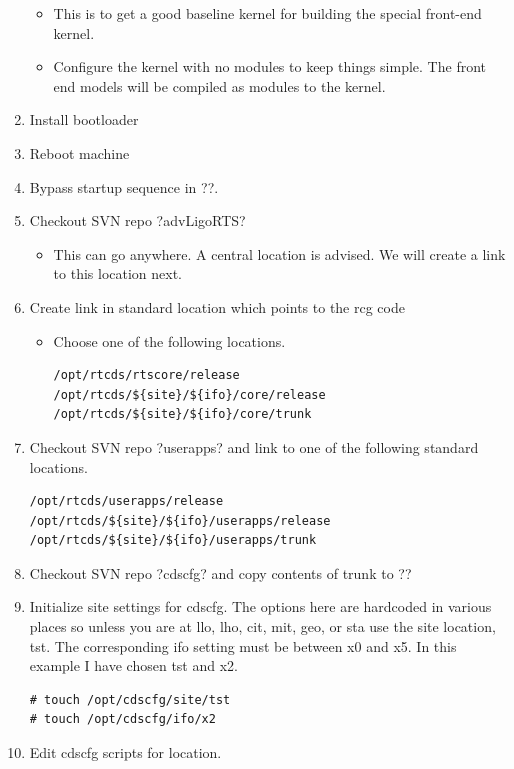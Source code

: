 \begin{enumerate}
\begin{itemize}
\item This is to get a good baseline kernel for building the special
    front-end kernel.
\item Configure the kernel with no modules to keep things simple. The front end
    models will be compiled as modules to the kernel.
\end{itemize}
\item Install bootloader
\item Reboot machine
\item Bypass startup sequence in \lstin?\etc\inittab?.
\item Checkout SVN repo \lstin?advLigoRTS?
\begin{itemize}
\item This can go anywhere. A central location is advised. We will create a
    link to this location next.
\end{itemize}
\item Create link in standard location which points to the rcg code
\begin{itemize}
\item Choose one of the following locations.
\begin{lstlisting}
/opt/rtcds/rtscore/release
/opt/rtcds/${site}/${ifo}/core/release
/opt/rtcds/${site}/${ifo}/core/trunk
\end{lstlisting}
\end{itemize}
\item Checkout SVN repo \lstin?userapps? and link to one of the following
standard locations.
\begin{lstlisting}
/opt/rtcds/userapps/release
/opt/rtcds/${site}/${ifo}/userapps/release
/opt/rtcds/${site}/${ifo}/userapps/trunk
\end{lstlisting}
\item Checkout SVN repo \lstin?cdscfg? and copy contents of trunk to \lstin?\opt\cdscfg?
\item Initialize site settings for cdscfg. The options here are hardcoded in
various places so unless you are at llo, lho, cit, mit, geo, or sta use the site
location, tst. The corresponding ifo setting must be between x0 and x5. In this
example I have chosen tst and x2.
\begin{lstlisting}
# touch /opt/cdscfg/site/tst
# touch /opt/cdscfg/ifo/x2
\end{lstlisting}
\item Edit cdscfg scripts for location.
\begin{itemize}

\end{itemize}
\end{enumerate}
